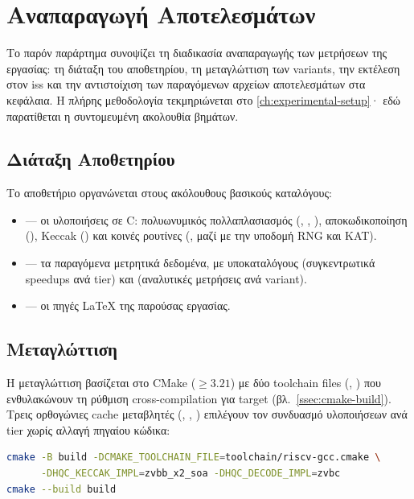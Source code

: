 \chapter{Αναπαραγωγή Αποτελεσμάτων}
\label{app:reproducibility}

Το παρόν παράρτημα συνοψίζει τη διαδικασία αναπαραγωγής των μετρήσεων της
εργασίας: τη διάταξη του αποθετηρίου, τη μεταγλώττιση των variants, την εκτέλεση
στον \gls{iss} και την αντιστοίχιση των παραγόμενων αρχείων αποτελεσμάτων στα
κεφάλαια.  Η πλήρης μεθοδολογία τεκμηριώνεται στο \cref{ch:experimental-setup}·
εδώ παρατίθεται η συντομευμένη ακολουθία βημάτων.

\section{Διάταξη Αποθετηρίου}

Το αποθετήριο οργανώνεται στους ακόλουθους βασικούς καταλόγους:

\begin{itemize}
  \item {} — οι υλοποιήσεις σε C: πολυωνυμικός πολλαπλασιασμός
    (, ,
    ), αποκωδικοποίηση (), Keccak
    () και κοινές ρουτίνες (, μαζί με την υποδομή
    RNG και KAT).
  \item {} — τα παραγόμενα μετρητικά δεδομένα, με
    υποκαταλόγους  (συγκεντρωτικά speedups ανά tier) και
     (αναλυτικές μετρήσεις ανά variant).
  \item {} — οι πηγές \LaTeX{} της παρούσας εργασίας.
\end{itemize}

\section{Μεταγλώττιση}

Η μεταγλώττιση βασίζεται στο CMake ($\geq 3.21$) με δύο toolchain files
(, ) που
ενθυλακώνουν τη ρύθμιση cross-compilation για target 
(βλ.\ \cref{ssec:cmake-build}).  Τρεις ορθογώνιες cache μεταβλητές
(, , )
επιλέγουν τον συνδυασμό υλοποιήσεων ανά tier χωρίς αλλαγή πηγαίου κώδικα:

\begin{lstlisting}[language=bash, basicstyle=\ttfamily\small, breaklines=true]
cmake -B build -DCMAKE_TOOLCHAIN_FILE=toolchain/riscv-gcc.cmake \
      -DHQC_KECCAK_IMPL=zvbb_x2_soa -DHQC_DECODE_IMPL=zvbc
cmake --build build
\end{lstlisting}

